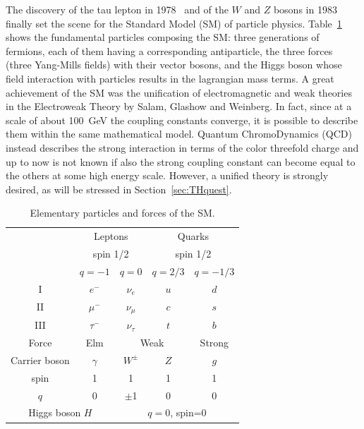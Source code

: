 The discovery of the tau lepton in 1978~\cite{} and of the 
$W$ and $Z$ bosons in 1983~\cite{} finally set the scene for 
the Standard Model (SM) of particle physics. Table~\ref{tab:SM} 
shows the fundamental particles composing the SM: three generations of 
fermions, each of them having a corresponding 
antiparticle, the three forces (three Yang-Mills fields) with 
their vector bosons, and the Higgs boson whose field interaction with
particles results in the lagrangian mass terms. A great achievement of the SM was 
the unification of electromagnetic and weak theories in the Electroweak 
Theory by Salam, Glashow and Weinberg. In fact, since at a scale of about 
100~GeV the coupling constants converge, it is possible to describe them 
within the same mathematical model. Quantum ChromoDynamics (QCD) instead 
describes the strong interaction in terms of the color threefold charge 
and up to now is not known if also the strong coupling constant can become 
equal to the others at some high energy scale. However, a unified theory is 
strongly desired, as will be stressed in Section~\ref{sec:THquest}.
\begin{table}[htb]\centering\begin{tabular}{ccccc}\toprule
&\multicolumn{2}{c}{Leptons}&\multicolumn{2}{c}{Quarks} \\ 
& \multicolumn{2}{c}{spin 1/2}& \multicolumn{2}{c}{spin 1/2}\\
& $q=-1$ & $q=0$ &$q=2/3$ &$q=-1/3$ \\ \midrule
I & $e^{-}$ & $\nu_{e}$ & $u$ & $d$ \\
II & $\mu^{-}$ & $\nu_{\mu}$ & $c$ & $s$ \\
III & $\tau^{-}$ & $\nu_{\tau}$ & $t$ & $b$ \\\bottomrule\toprule
Force & Elm &\multicolumn{2}{c}{Weak}& Strong\\\midrule
Carrier boson & $\gamma$ & $W^{\pm}$ &$Z$ & $g$\\
spin & 1 & 1 &  1 & 1 \\
$q$ & 0 & $\pm$1 & 0 & 0\\\bottomrule\toprule
 \multicolumn{2}{c}{Higgs boson $H$}& \multicolumn{3}{c}{$q=0$, spin=0} \\
\bottomrule
\end{tabular}\caption{Elementary particles and forces of the SM.}\label{tab:SM} \end{table}

